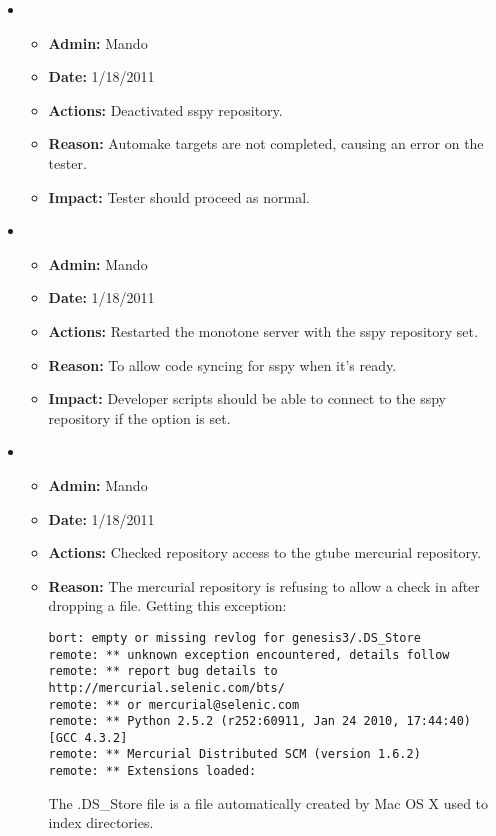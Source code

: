 \documentclass[12pt]{article}
\begin{document}
\begin{itemize}
\item
\begin{itemize}
\item[] {\bf Admin:} Mando
\item[] {\bf Date:} 1/18/2011 
\item[] {\bf Actions:}  Deactivated sspy repository.
\item[] {\bf Reason:} Automake targets are not completed, causing an error on the tester.
\item[] {\bf Impact:}  Tester should proceed as normal.
\end{itemize}

\item
\begin{itemize}
\item[] {\bf Admin:} Mando
\item[] {\bf Date:} 1/18/2011 
\item[] {\bf Actions:} Restarted the monotone server with the sspy repository set.
\item[] {\bf Reason:} To allow code syncing for sspy when it's ready.
\item[] {\bf Impact:}  Developer scripts should be able to connect to the sspy repository if the option is set.
\end{itemize}

\item
\begin{itemize}
\item[] {\bf Admin:} Mando
\item[] {\bf Date:} 1/18/2011 
\item[] {\bf Actions:} Checked repository access to the gtube mercurial repository.
\item[] {\bf Reason:} The mercurial repository is refusing to allow a check in after dropping a file. Getting this exception:

\begin{verbatim}
bort: empty or missing revlog for genesis3/.DS_Store
remote: ** unknown exception encountered, details follow
remote: ** report bug details to http://mercurial.selenic.com/bts/
remote: ** or mercurial@selenic.com
remote: ** Python 2.5.2 (r252:60911, Jan 24 2010, 17:44:40) [GCC 4.3.2]
remote: ** Mercurial Distributed SCM (version 1.6.2)
remote: ** Extensions loaded: 

\end{verbatim} 

The .DS\_Store file is a file automatically created by Mac OS X used to index directories.  


\end{itemize}
\end{itemize}
\end{document}

